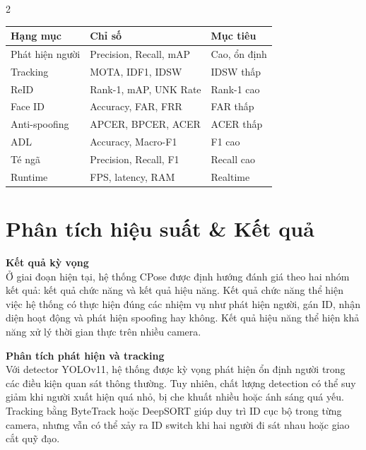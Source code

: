 \documentclass[a4paper, twoside, 12pt]{article}
\begin{document}
\begin{multicols}{2}
\vspace{0.2cm}
\begin{center}
\label{tab:evaluation_metrics}
\renewcommand{\arraystretch}{1.2}
\scriptsize
\begin{tabular}{|p{2.4cm}|p{3.2cm}|p{2.0cm}|}
\hline
\textbf{Hạng mục} & \textbf{Chỉ số} & \textbf{Mục tiêu} \\
\hline
Phát hiện người & Precision, Recall, mAP & Cao, ổn định \\
\hline
Tracking & MOTA, IDF1, IDSW & IDSW thấp \\
\hline
ReID & Rank-1, mAP, UNK Rate & Rank-1 cao \\
\hline
Face ID & Accuracy, FAR, FRR & FAR thấp \\
\hline
Anti-spoofing & APCER, BPCER, ACER & ACER thấp \\
\hline
ADL & Accuracy, Macro-F1 & F1 cao \\
\hline
Té ngã & Precision, Recall, F1 & Recall cao \\
\hline
Runtime & FPS, latency, RAM & Realtime \\
\hline
\end{tabular}
\end{center}

\vspace{0.2cm}

\section{Phân tích hiệu suất \& Kết quả}
\vspace{-0.6cm}

\hspace*{0.5cm}\textbf{Kết quả kỳ vọng}\\
Ở giai đoạn hiện tại, hệ thống CPose được định hướng đánh giá theo hai nhóm kết quả: kết quả chức năng và kết quả hiệu năng. Kết quả chức năng thể hiện việc hệ thống có thực hiện đúng các nhiệm vụ như phát hiện người, gán ID, nhận diện hoạt động và phát hiện spoofing hay không. Kết quả hiệu năng thể hiện khả năng xử lý thời gian thực trên nhiều camera.

\vspace{0.1cm}
\hspace*{0.5cm}\textbf{Phân tích phát hiện và tracking}\\
Với detector YOLOv11, hệ thống được kỳ vọng phát hiện ổn định người trong các điều kiện quan sát thông thường. Tuy nhiên, chất lượng detection có thể suy giảm khi người xuất hiện quá nhỏ, bị che khuất nhiều hoặc ánh sáng quá yếu. Tracking bằng ByteTrack hoặc DeepSORT giúp duy trì ID cục bộ trong từng camera, nhưng vẫn có thể xảy ra ID switch khi hai người đi sát nhau hoặc giao cắt quỹ đạo.


\end{multicols}
\end{document}
